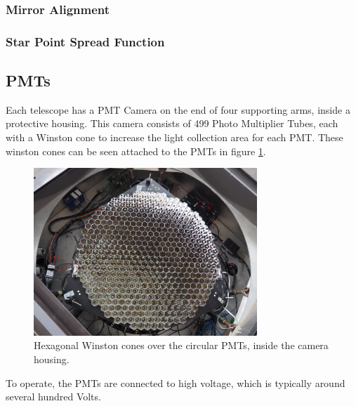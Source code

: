 \subsubsection{Mirror Alignment}

\subsubsection{Star Point Spread Function}


\subsection{PMTs}\label{sec:pmts}

Each telescope has a PMT Camera on the end of four supporting arms, inside a protective housing.
This camera consists of 499 Photo Multiplier Tubes, each with a Winston cone to increase the light collection area for each PMT.
These winston cones can be seen attached to the PMTs in figure \ref{fig:winstcones}.

\begin{figure}[h]
  \begin{center}
    \includegraphics[width=0.75\textwidth]{images/winston_cones_t2}
    \caption[Winston Cones]{Hexagonal Winston cones over the circular PMTs, inside the camera housing.}\label{fig:winstcones}
  \end{center}
\end{figure}

To operate, the PMTs are connected to high voltage, which is typically around several hundred Volts.

